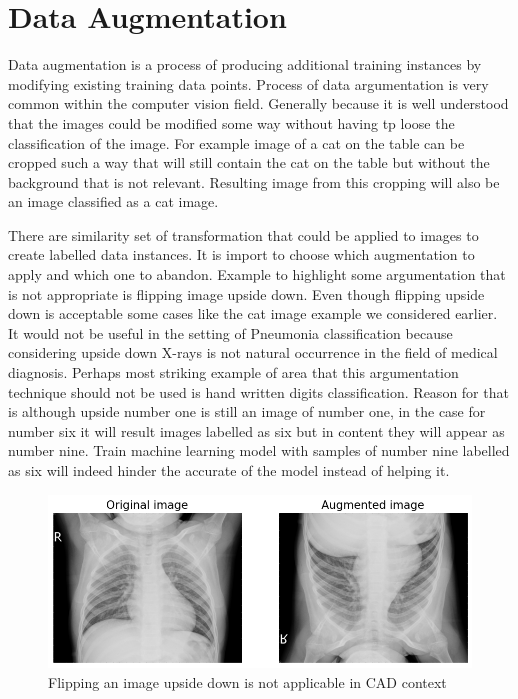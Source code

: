 \section{Data Augmentation}
Data augmentation is a process of producing additional training instances by modifying existing training data points.
Process of data argumentation is very common within the computer vision field.
Generally because it is well understood that the images could be modified some way without having tp loose the classification of the image.
For example image of a cat on the table can be cropped such a way that will still contain the cat on the table but without the background that is not relevant.
Resulting image from this cropping will also be an image classified as a cat image.

There are similarity set of transformation that could be applied to images to create labelled data instances. 
It is import to choose which augmentation to apply and which one to abandon.
Example to highlight some argumentation that is not appropriate is flipping image upside down. 
Even though flipping upside down is acceptable some cases like the cat image example we considered earlier. 
It would not be useful in the setting of Pneumonia classification because considering upside down X-rays is not natural occurrence in the field of medical diagnosis.
Perhaps most striking example of area that this argumentation technique should not be used is hand written digits classification. 
Reason for that is although upside number one is still an image of number one, in the case for number six it will result images labelled as six but in content they will appear as number nine. 
Train machine learning model with samples of number nine labelled as six will indeed hinder the accurate of the model instead of helping it.

\begin{figure}[H]
    \centering
    \includegraphics[width=\textwidth]{img/augmented-image-1588951790.png}
    \caption{Flipping an image upside down is not applicable in CAD context}
    \label{fig:upsidedownxray}
  \end{figure}

